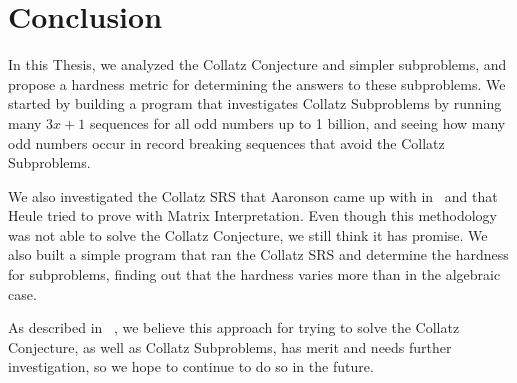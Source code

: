 \chapter{Conclusion} \label{sec:conclusion}
In this Thesis, we analyzed the Collatz Conjecture and simpler subproblems, and propose a hardness metric for determining the answers to these subproblems. We started by building a program that investigates Collatz Subproblems by running many $3x+1$ sequences for all odd numbers up to 1 billion, and seeing how many odd numbers occur in record breaking sequences that avoid the Collatz Subproblems. \par
We also investigated the Collatz SRS that Aaronson came up with in~\cite{HeuleAaronson} and that Heule tried to prove with Matrix Interpretation. Even though this methodology was not able to solve the Collatz Conjecture, we still think it has promise. We also built a simple program that ran the Collatz SRS and determine the hardness for subproblems, finding out that the hardness varies more than in the algebraic case.\par
As described in ~\cite{HeuleAaronson}, we believe this approach for trying to solve the Collatz Conjecture, as well as Collatz Subproblems, has merit and needs further investigation, so we hope to continue to do so in the future.